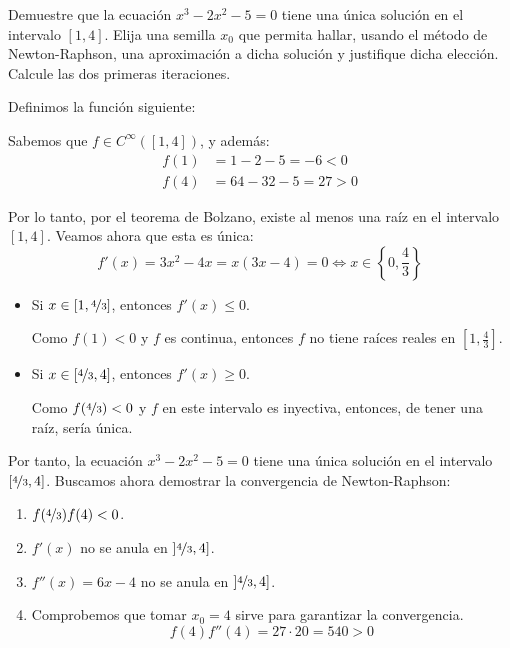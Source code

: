 \begin{ejercicio}\label{ej:1.1.3}
    Demuestre que la ecuación $x^3 - 2x^2 - 5 = 0$ tiene una única solución en el intervalo $[1, 4]$. Elija una semilla $x_0$ que permita hallar, usando el método de Newton-Raphson, una aproximación a dicha solución y justifique dicha elección. Calcule las dos primeras iteraciones.

    Definimos la función siguiente:

    Sabemos que $f\in C^{\infty}([1,4])$, y además:
    \begin{align*}
        f(1)&=1-2-5=-6<0\\
        f(4)&=64-32-5=27>0
    \end{align*}

    Por lo tanto, por el teorema de Bolzano, existe al menos una raíz en el intervalo $[1,4]$. Veamos ahora que esta es única:
    \begin{equation*}
        f'(x)=3x^2-4x=x(3x-4)=0\iff x\in \left\{0,\frac{4}{3}\right\}
    \end{equation*}
    \begin{itemize}
        \item Si $x\in[1,\nicefrac{4}{3}]$, entonces $f'(x)\leq 0$.
        
        Como $f(1)<0$ y $f$ es continua, entonces $f$ no tiene raíces reales en $[1,\frac{4}{3}]$.
        \item Si $x\in[\nicefrac{4}{3},4]$, entonces $f'(x)\geq 0$.
        
        Como $f(\nicefrac{4}{3})<0$ y $f$ en este intervalo es inyectiva, entonces, de tener una raíz, sería única.
    \end{itemize}

    Por tanto, la ecuación $x^3-2x^2-5=0$ tiene una única solución en el intervalo $[\nicefrac{4}{3},4]$. Buscamos ahora demostrar la convergencia de Newton-Raphson:
    \begin{enumerate}
        \item $f(\nicefrac{4}{3})f(4)<0$.
        \item $f'(x)$ no se anula en $]\nicefrac{4}{3},4]$.
        \item $f''(x)=6x-4$ no se anula en $]\nicefrac{4}{3},4]$.
        \item Comprobemos que tomar $x_0=4$ sirve para garantizar la convergencia.
        \begin{equation*}
            f(4)f''(4)=27\cdot 20=540>0
        \end{equation*}
    \end{enumerate}


\end{ejercicio}
